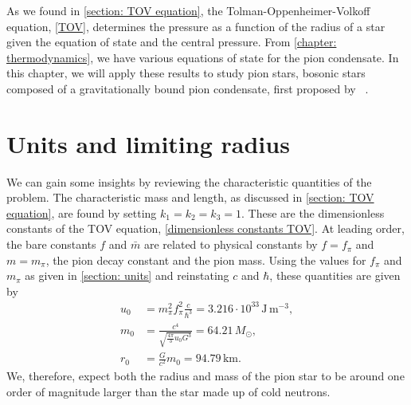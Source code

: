 As we found in \autoref{section: TOV equation}, the Tolman-Oppenheimer-Volkoff equation, \autoref{TOV}, determines the pressure as a function of the radius of a star given the equation of state and the central pressure.
From \autoref{chapter: thermodynamics}, we have various equations of state for the pion condensate.
In this chapter, we will apply these results to study pion stars, bosonic stars composed of a gravitationally bound pion condensate, first proposed by \citeauthor{brandtNewClassCompact2018}~\autocite{brandtNewClassCompact2018}.



\section{Units and limiting radius}

We can gain some insights by reviewing the characteristic quantities of the problem.
The characteristic mass and length, as discussed in \autoref{section: TOV equation}, are found by setting $k_1 = k_2 = k_3 = 1$.
These are the dimensionless constants of the TOV equation, \autoref{dimensionless constants TOV}.
At leading order, the bare constants $f$ and $\bar m$ are related to physical constants by $f = f_\pi$ and $m = m_\pi$, the pion decay constant and the pion mass.
Using the values for $f_\pi$ and $m_\pi$ as given in \autoref{section: units} and reinstating $c$ and $\hbar$, these quantities are given by
%
\begin{align}
    u_0 & =m_\pi^2 f_\pi^2 \frac{c}{\hbar^3}
    = 3.216\cdot 10^{33} \, \text{J}\,\text{m}^{-3}, \\
    m_0 & = \frac{c^4}{\sqrt{\frac{4 \pi}{ 3} u_0 G^3}} = 64.21\, M_\odot, \\
    r_0 & = \frac{G}{c^2} m_0 = 94.79 \, \text{km}.
\end{align}
%
We, therefore, expect both the radius and mass of the pion star to be around one order of magnitude larger than the star made up of cold neutrons.


